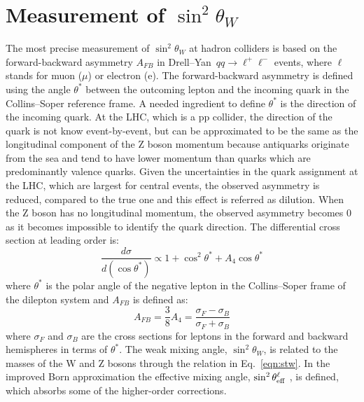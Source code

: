\documentclass{moriond}
\def\stw{\sin^2\theta_W}
\def\stl{\sin^2\theta^\ell_{\rm eff}}
\begin{document}
\section{Measurement of $\stw$}

The most precise measurement of $\stw$ at hadron colliders is based on
the forward-backward asymmetry $A_{FB}$ in Drell–Yan~$qq \to
\ell^+\ell^-$ events, where $\ell$ stands for muon ($\mu$) or electron
(e). The forward-backward asymmetry is defined using the angle
$\theta^*$ between the outcoming lepton and the incoming quark in the
Collins–Soper reference frame. A needed ingredient to define
$\theta^*$ is the direction of the incoming quark. At the LHC, which
is a pp collider, the direction of the quark is not know
event-by-event, but can be approximated to be the same as the
longitudinal component of the Z boson momentum because antiquarks
originate from the sea and tend to have lower momentum than quarks
which are predominantly valence quarks. Given the uncertainties in the
quark assignment at the LHC, which are largest for central events, the
observed asymmetry is reduced, compared to the true one and this
effect is referred as dilution.
When the Z boson has no longitudinal momentum, the observed asymmetry
becomes 0 as it becomes impossible to identify the quark
direction. The differential cross section at leading order is:
%
\begin{equation}
  \frac{d\sigma}{d(\cos\theta^*)}\propto 1 + \cos^2\theta^* + A_4\cos\theta^*
  \label{eqn:diffxsec}
\end{equation}
%
where $\theta^*$ is the polar angle of the negative lepton in the Collins–Soper frame of the dilepton system
and $A_{FB}$ is defined as:
\begin{equation}
  A_{FB} = \frac{3}{8}A_4 = \frac{\sigma_F - \sigma_B}{\sigma_F + \sigma_B}
  \label{eqn:afb}
\end{equation}
where $\sigma_F$ and $\sigma_B$ are the cross sections for leptons in
the forward and backward hemispheres in terms of $\theta^*$.  The weak
mixing angle, $\stw$, is related to the masses of the W and Z bosons
through the relation in Eq.~\ref{eqn:stw}.
In the improved Born approximation the effective mixing angle, $\stl$ , is
defined, which absorbs some of the higher-order corrections.
\end{document}
